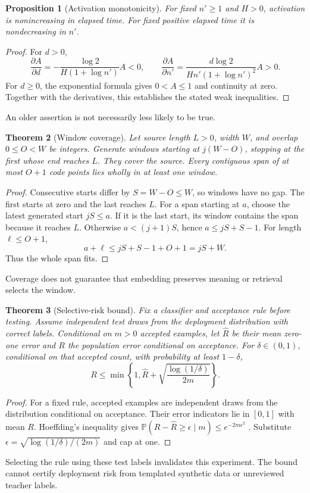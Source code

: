 \documentclass[11pt]{article}
\newtheorem{theorem}{Theorem}
\newtheorem{proposition}[theorem]{Proposition}
\newcommand{\Prob}{\mathbb{P}}
\begin{document}
\begin{proposition}[Activation monotonicity]
For fixed $n'\geq1$ and $H>0$, activation is nonincreasing in elapsed time. For fixed positive elapsed time it is nondecreasing in $n'$.
\end{proposition}
\begin{proof}
For $d>0$,
\[
 \frac{\partial A}{\partial d}
 =-\frac{\log2}{H(1+\log n')}A<0,\qquad
 \frac{\partial A}{\partial n'}
 =\frac{d\log2}{Hn'(1+\log n')^2}A>0.
\]
For $d\geq0$, the exponential formula gives $0<A\leq1$ and continuity at zero. Together with the derivatives, this establishes the stated weak inequalities.
\end{proof}
An older assertion is not necessarily less likely to be true.

\begin{theorem}[Window coverage]
Let source length $L>0$, width $W$, and overlap $0\leq O<W$ be integers. Generate windows starting at $j(W-O)$, stopping at the first whose end reaches $L$. They cover the source. Every contiguous span of at most $O+1$ code points lies wholly in at least one window.
\end{theorem}
\begin{proof}
Consecutive starts differ by $S=W-O\leq W$, so windows have no gap. The first starts at zero and the last reaches $L$. For a span starting at $a$, choose the latest generated start $jS\leq a$. If it is the last start, its window contains the span because it reaches $L$. Otherwise $a<(j+1)S$, hence $a\leq jS+S-1$. For length $\ell\leq O+1$,
\[
 a+\ell\leq jS+S-1+O+1=jS+W.
\]
Thus the whole span fits.
\end{proof}
Coverage does not guarantee that embedding preserves meaning or retrieval selects the window.

\begin{theorem}[Selective-risk bound]
Fix a classifier and acceptance rule before testing. Assume independent test draws from the deployment distribution with correct labels. Conditional on $m>0$ accepted examples, let $\widehat R$ be their mean zero-one error and $R$ the population error conditional on acceptance. For $\delta\in(0,1)$, conditional on that accepted count, with probability at least $1-\delta$,
\[
 R\leq\min\left\{1,\widehat R+
 \sqrt{\frac{\log(1/\delta)}{2m}}\right\}.
\]
\end{theorem}
\begin{proof}
For a fixed rule, accepted examples are independent draws from the distribution conditional on acceptance. Their error indicators lie in $[0,1]$ with mean $R$. Hoeffding's inequality gives
$\Prob(R-\widehat R\geq\epsilon\mid m)\leq e^{-2m\epsilon^2}$ \citep{hoeffding}.
Substitute $\epsilon=\sqrt{\log(1/\delta)/(2m)}$ and cap at one.
\end{proof}
Selecting the rule using these test labels invalidates this experiment. The bound cannot certify deployment risk from templated synthetic data or unreviewed teacher labels.
\end{document}
